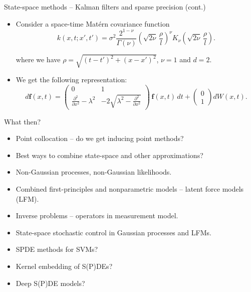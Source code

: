 \documentclass[first=dgreen,second=purple,presentation]{elecslides}
\begin{document}
\begin{frame}{State-space methods -- Kalman filters and sparse precision (cont.)}
\begin{example}
%
\begin{itemize}[<+->]
\item Consider a space-time Mat\'ern covariance function
%
  $$ k(x,t;x',t') = \sigma^2\frac{2^{1-\nu}}{\Gamma(\nu)}\left(\sqrt{2\nu}\,\frac{\rho}{
l}\right)^\nu K_\nu\left(\sqrt{2\nu}\,\frac{\rho}{l}\right). $$

where we have $\rho = \sqrt{(t-t')^2+ (x-x')^2}$, $\nu=1$ and $d=2$.

\item We get the following representation:
%
\begin{equation}
  d\mathbf{f}(x,t) = 
       \begin{pmatrix} 
        0 & 1 \\ 
        \frac{\partial^2}{\partial x^2} - \lambda^2
        & -2 \sqrt{\lambda^2 - \frac{\partial^2}{\partial x^2}}
      \end{pmatrix} \, \mathbf{f}(x,t) \, dt+ \begin{pmatrix} 0 \\ 1 \end{pmatrix} dW(x,t).
\nonumber
\end{equation}
%

%
%
\end{itemize}
\end{example}

\end{frame}


\begin{frame}{What then?}

\begin{itemize}[<+->]
\item \alert{Point collocation} -- do we get \alert{inducing point} methods?
\item Best ways to \alert{combine state-space} and other approximations?
\item \alert{Non-Gaussian} processes, non-Gaussian likelihoods.
\item \alert{Combined first-principles} and nonparametric models -- latent force models (LFM).
\item \alert{Inverse problems} -- operators in measurement model.
\item \alert{State-space stochastic control} in Gaussian processes and LFMs.
\item \alert{SPDE methods for SVMs?}
\item \alert{Kernel embedding of S(P)DEs?}
\item \alert{Deep S(P)DE models?}
\end{itemize}

\end{frame}


\end{document}

